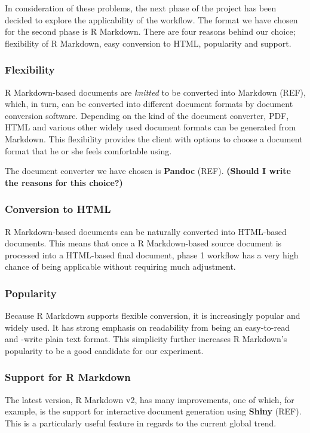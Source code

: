 \documentclass[a4paper, 12pt]{report}
\begin{document}
In consideration of these problems, the next phase of the project has been decided to explore the applicability of the workflow. The format we have chosen for the second phase is R Markdown. There are four reasons behind our choice; flexibility of R Markdown, easy conversion to HTML, popularity and support.

\subsubsection*{Flexibility}
R Markdown-based documents are \emph{knitted} to be converted into Markdown (REF), which, in turn, can be converted into different document formats by document conversion software. Depending on the kind of the document converter, PDF, HTML and various other widely used document formats can be generated from Markdown. This flexibility provides the client with options to choose a document format that he or she feels comfortable using.

The document converter we have chosen is \textbf{Pandoc} (REF). \textbf{(Should I write the reasons for this choice?)}

\subsubsection*{Conversion to HTML}
R Markdown-based documents can be naturally converted into HTML-based documents. This means that once a R Markdown-based source document is processed into a HTML-based final document, phase 1 workflow has a very high chance of being applicable without requiring much adjustment.

\subsubsection*{Popularity}
Because R Markdown supports flexible conversion, it is increasingly popular and widely used. It has strong emphasis on readability from being an easy-to-read and -write plain text format. This simplicity further increases R Markdown's popularity to be a good candidate for our experiment.

\subsubsection*{Support for R Markdown}
The latest version, R Markdown v2, has many improvements, one of which, for example, is the support for interactive document generation using \textbf{Shiny} (REF). This is a particularly useful feature in regards to the current global trend.
\end{document}
